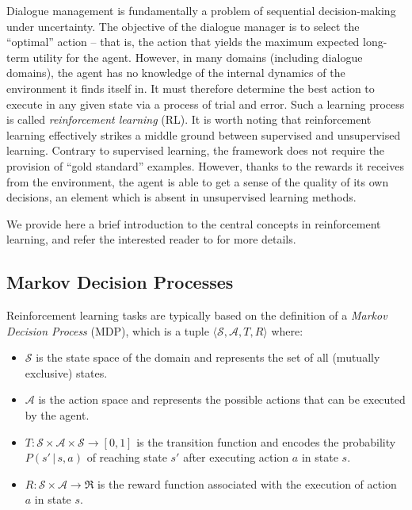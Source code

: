 Dialogue management is fundamentally a problem of sequential decision-making under uncertainty. The objective of the dialogue manager is to select the ``optimal'' action -- that is, the action that yields the maximum expected long-term utility for the agent. However, in many domains (including dialogue domains), the agent has no knowledge of the internal dynamics of the environment it finds itself in.  It must therefore determine the best action to execute in any given state via a process of trial and error.  Such a learning process is called \textit{reinforcement learning} (RL).  It is worth noting that reinforcement learning effectively strikes a middle ground between supervised and unsupervised learning.  Contrary to supervised learning, the framework does not require the provision of ``gold standard'' examples.  However,  thanks to the rewards it receives from the environment, the agent is able to get a sense of the quality of its own decisions, an element which is absent in unsupervised learning methods.  

We provide here a brief introduction to the central concepts in reinforcement learning, and refer the interested reader to \cite{citeulike:112017} for more details. 

\subsection{Markov Decision Processes}
\label{sec:mdp}

Reinforcement learning tasks are typically based on the definition of a \textit{Markov Decision Process} (MDP), which is a tuple $\langle \mathcal{S}, \mathcal{A}, T, R \rangle$ where:
\begin{itemize}
\item $\mathcal{S}$ is the state space of the domain and represents the set of all (mutually exclusive) states.
\item $\mathcal{A}$ is the action space and represents the possible actions that can be executed by the agent.
\item $T: \mathcal{S} \times \mathcal{A} \times \mathcal{S} \rightarrow [0,1]$ is the transition function and encodes the probability $P(s'\, | \, s,a)$ of reaching state $s'$ after executing action $a$ in state $s$.
\item $R:  \mathcal{S} \times \mathcal{A} \rightarrow \Re$ is the reward function associated with the execution of action $a$ in state $s$.
\end{itemize}
 
